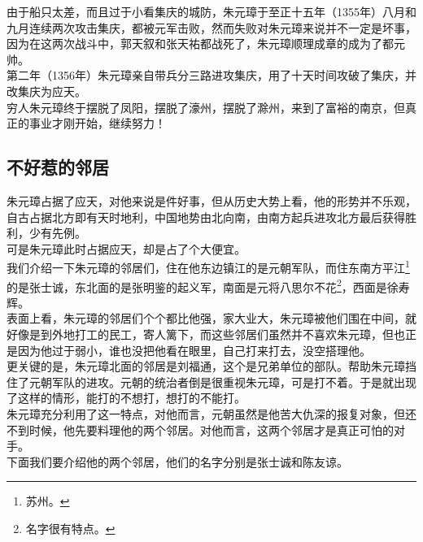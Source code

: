 \begin{multicols}{\theparacolNo}
由于船只太差，而且过于小看集庆的城防，朱元璋于至正十五年（1355年）八月和九月连续两次攻击集庆，都被元军击败，然而失败对朱元璋来说并不一定是坏事，因为在这两次战斗中，郭天叙和张天祐都战死了，朱元璋顺理成章的成为了都元帅。\\

第二年（1356年）朱元璋亲自带兵分三路进攻集庆，用了十天时间攻破了集庆，并改集庆为应天。\\

穷人朱元璋终于摆脱了凤阳，摆脱了濠州，摆脱了滁州，来到了富裕的南京，但真正的事业才刚开始，继续努力！\\

\subsection{不好惹的邻居}
朱元璋占据了应天，对他来说是件好事，但从历史大势上看，他的形势并不乐观，自古占据北方即有天时地利，中国地势由北向南，由南方起兵进攻北方最后获得胜利，少有先例。\\

可是朱元璋此时占据应天，却是占了个大便宜。\\

我们介绍一下朱元璋的邻居们，住在他东边镇江的是元朝军队，而住东南方平江\footnote{苏州。}的是张士诚，东北面的是张明鉴的起义军，南面是元将八思尔不花\footnote{名字很有特点。}，西面是徐寿辉。\\

表面上看，朱元璋的邻居们个个都比他强，家大业大，朱元璋被他们围在中间，就好像是到外地打工的民工，寄人篱下，而这些邻居们虽然并不喜欢朱元璋，但也正是因为他过于弱小，谁也没把他看在眼里，自己打来打去，没空搭理他。\\

更关键的是，朱元璋北面的邻居是刘福通，这个是兄弟单位的部队。帮助朱元璋挡住了元朝军队的进攻。元朝的统治者倒是很重视朱元璋，可是打不着。于是就出现了这样的情形，能打的不想打，想打的不能打。\\

朱元璋充分利用了这一特点，对他而言，元朝虽然是他苦大仇深的报复对象，但还不到时候，他先要料理他的两个邻居。对他而言，这两个邻居才是真正可怕的对手。\\

下面我们要介绍他的两个邻居，他们的名字分别是张士诚和陈友谅。\\
\ifnum{}
	\end{multicols}
\fi
\newpage
